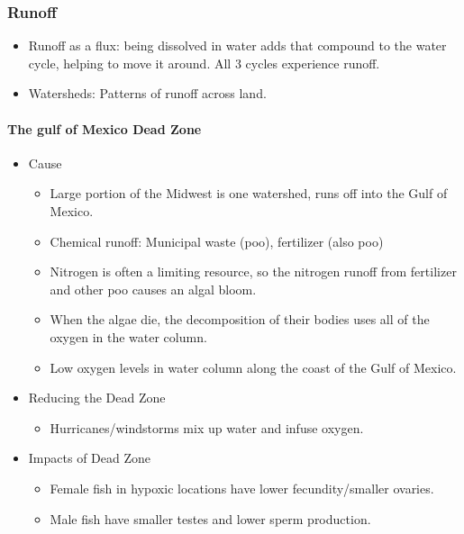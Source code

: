 \documentclass[12pt]{article}
\begin{document}
\subsubsection{Runoff}

\begin{itemize}
    \item Runoff as a flux: being dissolved in water adds that compound to the water cycle, helping to move it around. All 3 cycles experience runoff.
    \item  Watersheds: Patterns of runoff across land.
\end{itemize}

\paragraph{The gulf of Mexico Dead Zone}
\begin{itemize}
    \item Cause
          \begin{itemize}
              \item Large portion of the Midwest is one watershed, runs off into the Gulf of Mexico.
              \item Chemical runoff: Municipal waste (poo), fertilizer (also poo)
              \item Nitrogen is often a limiting resource, so the nitrogen runoff from fertilizer and other poo causes an algal bloom.
              \item When the algae die, the decomposition of their bodies uses all of the oxygen in the water column.
              \item Low oxygen levels in water column along the coast of the Gulf of Mexico.
          \end{itemize}
    \item Reducing the Dead Zone
          \begin{itemize}
              \item Hurricanes/windstorms mix up water and infuse oxygen.
          \end{itemize}
    \item Impacts of Dead Zone
          \begin{itemize}
              \item Female fish in hypoxic locations have lower fecundity/smaller ovaries.
              \item Male fish have smaller testes and lower sperm production.
          \end{itemize}
\end{itemize}
\end{document}
